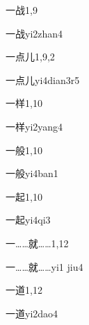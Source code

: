 \begin{entry}{一战}{1,9}
  \begin{phonetics}{一战}{yi2zhan4}
  \end{phonetics}
\end{entry}

\begin{entry}{一点儿}{1,9,2}
  \begin{phonetics}{一点儿}{yi4dian3r5}
  \end{phonetics}
\end{entry}

\begin{entry}{一样}{1,10}
  \begin{phonetics}{一样}{yi2yang4}
  \end{phonetics}
\end{entry}

\begin{entry}{一般}{1,10}
  \begin{phonetics}{一般}{yi4ban1}
  \end{phonetics}
\end{entry}

\begin{entry}{一起}{1,10}
  \begin{phonetics}{一起}{yi4qi3}
  \end{phonetics}
\end{entry}

\begin{entry}{一……就……}{1,12}
  \begin{phonetics}{一……就……}{yi1 jiu4}
  \end{phonetics}
\end{entry}

\begin{entry}{一道}{1,12}
  \begin{phonetics}{一道}{yi2dao4}
  \end{phonetics}
\end{entry}


